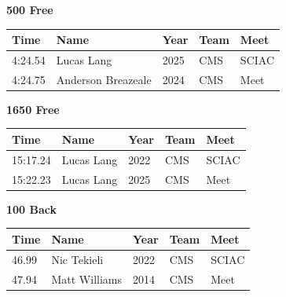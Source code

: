 \vspace{1.2em}
\noindent\begin{minipage}[t]{0.98\textwidth}
\centering
\textbf{\textcolor{teamprimary}{500 Free}}\par
\vspace{0.5em}
\centering
\small
\renewcommand{\arraystretch}{1.0}
\setlength{\tabcolsep}{4pt}
\begin{tabular}{@{}p{2.5cm}p{4.5cm}p{1.5cm}p{2.5cm}p{2.5cm}@{}}
\toprule
\textbf{Time} & \textbf{Name} & \textbf{Year} & \textbf{Team} & \textbf{Meet} \\
\midrule
4:24.54 & Lucas Lang & 2025 & CMS & SCIAC \\
4:24.75 & Anderson Breazeale & 2024 & CMS & Meet \\
\bottomrule
\end{tabular}
\end{minipage}
\vspace{1.2em}
\noindent\begin{minipage}[t]{0.98\textwidth}
\centering
\textbf{\textcolor{teamprimary}{1650 Free}}\par
\vspace{0.5em}
\centering
\small
\renewcommand{\arraystretch}{1.0}
\setlength{\tabcolsep}{4pt}
\begin{tabular}{@{}p{2.5cm}p{4.5cm}p{1.5cm}p{2.5cm}p{2.5cm}@{}}
\toprule
\textbf{Time} & \textbf{Name} & \textbf{Year} & \textbf{Team} & \textbf{Meet} \\
\midrule
15:17.24 & Lucas Lang & 2022 & CMS & SCIAC \\
15:22.23 & Lucas Lang & 2025 & CMS & Meet \\
\bottomrule
\end{tabular}
\end{minipage}
\vspace{1.2em}
\noindent\begin{minipage}[t]{0.98\textwidth}
\centering
\textbf{\textcolor{teamprimary}{100 Back}}\par
\vspace{0.5em}
\centering
\small
\renewcommand{\arraystretch}{1.0}
\setlength{\tabcolsep}{4pt}
\begin{tabular}{@{}p{2.5cm}p{4.5cm}p{1.5cm}p{2.5cm}p{2.5cm}@{}}
\toprule
\textbf{Time} & \textbf{Name} & \textbf{Year} & \textbf{Team} & \textbf{Meet} \\
\midrule
46.99 & Nic Tekieli & 2022 & CMS & SCIAC \\
47.94 & Matt Williams & 2014 & CMS & Meet \\
\bottomrule
\end{tabular}
\end{minipage}
